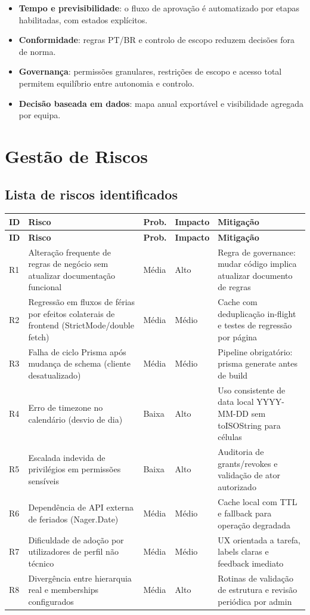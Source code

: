 \documentclass[11pt,a4paper]{article}
\begin{document}
\begin{itemize}
  \item \textbf{Tempo e previsibilidade}: o fluxo de aprovação é automatizado por etapas habilitadas, com estados explícitos.
  \item \textbf{Conformidade}: regras PT/BR e controlo de escopo reduzem decisões fora de norma.
  \item \textbf{Governança}: permissões granulares, restrições de escopo e acesso total permitem equilíbrio entre autonomia e controlo.
  \item \textbf{Decisão baseada em dados}: mapa anual exportável e visibilidade agregada por equipa.
\end{itemize}

\section{Gestão de Riscos}
\subsection{Lista de riscos identificados}
\begin{longtable}{p{1.3cm} p{5.2cm} p{2.2cm} p{2.2cm} p{4.2cm}}
\toprule
\textbf{ID} & \textbf{Risco} & \textbf{Prob.} & \textbf{Impacto} & \textbf{Mitigação} \\
\midrule
\endfirsthead
\toprule
\textbf{ID} & \textbf{Risco} & \textbf{Prob.} & \textbf{Impacto} & \textbf{Mitigação} \\
\midrule
\endhead
R1 & Alteração frequente de regras de negócio sem atualizar documentação funcional & Média & Alto & Regra de governance: mudar código implica atualizar documento de regras \\
R2 & Regressão em fluxos de férias por efeitos colaterais de frontend (StrictMode/double fetch) & Média & Médio & Cache com deduplicação in-flight e testes de regressão por página \\
R3 & Falha de ciclo Prisma após mudança de schema (cliente desatualizado) & Média & Médio & Pipeline obrigatório: prisma generate antes de build \\
R4 & Erro de timezone no calendário (desvio de dia) & Baixa & Alto & Uso consistente de data local YYYY-MM-DD sem toISOString para células \\
R5 & Escalada indevida de privilégios em permissões sensíveis & Baixa & Alto & Auditoria de grants/revokes e validação de ator autorizado \\
R6 & Dependência de API externa de feriados (Nager.Date) & Média & Médio & Cache local com TTL e fallback para operação degradada \\
R7 & Dificuldade de adoção por utilizadores de perfil não técnico & Média & Médio & UX orientada a tarefa, labels claras e feedback imediato \\
R8 & Divergência entre hierarquia real e memberships configurados & Média & Alto & Rotinas de validação de estrutura e revisão periódica por admin \\
\bottomrule
\end{longtable}
\end{document}
